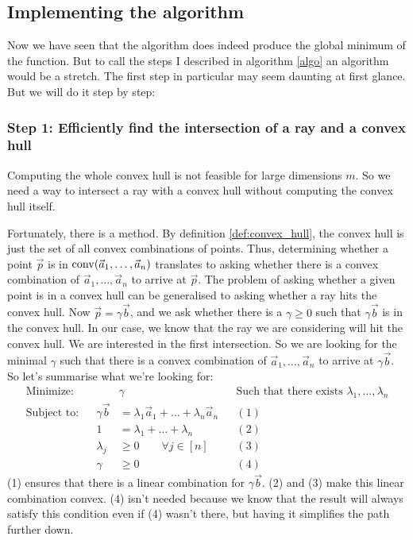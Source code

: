 \subsection{Implementing the algorithm}
Now we have seen that the algorithm does indeed produce the global minimum of the function. But to call the steps I described in algorithm \ref{algo} an algorithm would be a stretch. The first step in particular may seem daunting at first glance. But we will do it step by step:

\subsubsection{Step 1: Efficiently find the intersection of a ray and a convex hull}
Computing the whole convex hull is not feasible for large dimensions $m$. So we need a way to intersect a ray with a convex hull without computing the convex hull itself.

Fortunately, there is a method. By definition \ref{def:convex_hull}, the convex hull is just the set of all convex combinations of points. Thus, determining whether a point $\vec p$ is in $\operatorname{conv}(\vec a_1, \dots, \vec a_n)$ translates to asking whether there is a convex combination of $\vec a_1, \dots, \vec a_n$ to arrive at $\vec p$. The problem of asking whether a given point is in a convex hull can be generalised to asking whether a ray hits the convex hull. Now $\vec p = \gamma \vec b$, and we ask whether there is a $\gamma \geq 0$ such that $\gamma\vec b$ is in the convex hull. In our case, we know that the ray we are considering will hit the convex hull. We are interested in the first intersection. So we are looking for the minimal $\gamma$ such that there is a convex combination of $\vec a_1, \dots, \vec a_n$ to arrive at $\gamma\vec b$. So let's summarise what we're looking for:
\begin{align*}
    \text{Minimize:}&&&\gamma  &&\text{Such that there exists } \lambda_1, \dots, \lambda_n\\
    \text{Subject to:}&&\gamma \vec b &=\lambda_1\vec a_1 + \dots  + \lambda_n\vec a_n &&(1)\\
    && 1 &= \lambda_1 + \dots + \lambda_n &&(2)\\
    && \lambda_j &\geq 0\qquad \forall j\in[n] &&(3)\\
    && \gamma &\geq 0 &&(4)
\end{align*}
(1) ensures that there is a linear combination for $\gamma\vec b$. (2) and (3) make this linear combination convex. (4) isn't needed because we know that the result will always satisfy this condition even if (4) wasn't there, but having it simplifies the path further down.

